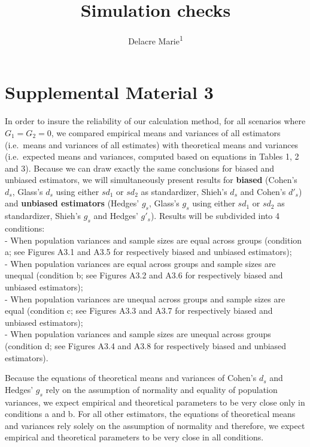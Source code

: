 \documentclass[
  man]{apa6}
\affiliation{
\vspace{0.5cm}
\textsuperscript{1} ULB}
\title{Simulation checks}
\author{Delacre Marie\textsuperscript{1}}
\date{}
\begin{document}
\maketitle

\hypertarget{supplemental-material-3}{%
\section{Supplemental Material 3}\label{supplemental-material-3}}

In order to insure the reliability of our calculation method, for all scenarios where \(G_1=G_2=0\), we compared empirical means and variances of all estimators (i.e.~means and variances of all estimates) with theoretical means and variances (i.e.~expected means and variances, computed based on equations in Tables 1, 2 and 3). Because we can draw exactly the same conclusions for biased and unbiased estimators, we will simultaneously present results for \textbf{biased} (Cohen's \(d_s\), Glass's \(d_s\) using either \(sd_1\) or \(sd_2\) as standardizer, Shieh's \(d_s\) and Cohen's \(d'_s\)) and \textbf{unbiased estimators} (Hedges' \(g_s\), Glass's \(g_s\) using either \(sd_1\) or \(sd_2\) as standardizer, Shieh's \(g_s\) and Hedges' \(g'_s\)). Results will be subdivided into 4 conditions:\\
- When population variances and sample sizes are equal across groups (condition a; see Figures A3.1 and A3.5 for respectively biased and unbiased estimators);\\
- When population variances are equal across groups and sample sizes are unequal (condition b; see Figures A3.2 and A3.6 for respectively biased and unbiased estimators);\\
- When population variances are unequal across groups and sample sizes are equal (condition c; see Figures A3.3 and A3.7 for respectively biased and unbiased estimators);\\
- When population variances and sample sizes are unequal across groups (condition d; see Figures A3.4 and A3.8 for respectively biased and unbiased estimators).

Because the equations of theoretical means and variances of Cohen's \(d_s\) and Hedges' \(g_s\) rely on the assumption of normality and equality of population variances, we expect empirical and theoretical parameters to be very close only in conditions a and b. For all other estimators, the equations of theoretical means and variances rely solely on the assumption of normality and therefore, we expect empirical and theoretical parameters to be very close in all conditions.
\end{document}
